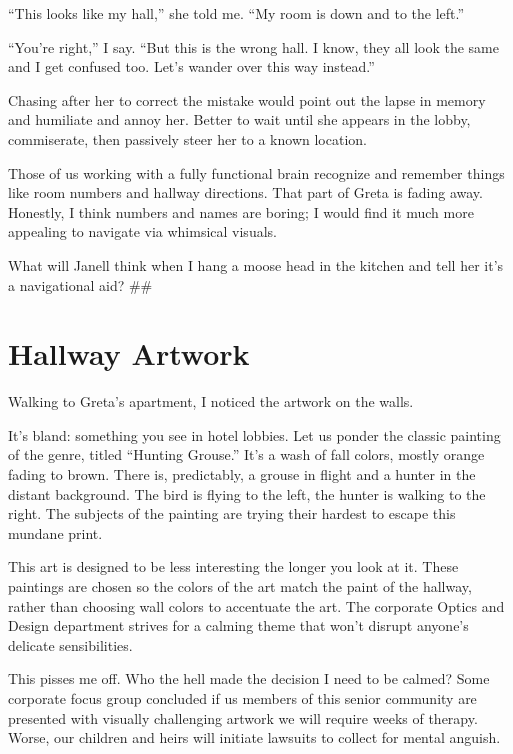 \documentclass[
  letterpaper,
  DIV=11,
  numbers=noendperiod]{scrreprt}
\begin{document}
``This looks like my hall,'' she told me. ``My room is down and to the
left.''

``You're right,'' I say. ``But this is the wrong hall. I know, they all
look the same and I get confused too. Let's wander over this way
instead.''

Chasing after her to correct the mistake would point out the lapse in
memory and humiliate and annoy her. Better to wait until she appears in
the lobby, commiserate, then passively steer her to a known location.

Those of us working with a fully functional brain recognize and remember
things like room numbers and hallway directions. That part of Greta is
fading away. Honestly, I think numbers and names are boring; I would
find it much more appealing to navigate via whimsical visuals.

What will Janell think when I hang a moose head in the kitchen and tell
her it's a navigational aid? \#\#


\chapter*{Hallway Artwork}\label{hallway-artwork}


Walking to Greta's apartment, I noticed the artwork on the walls.

It's bland: something you see in hotel lobbies. Let us ponder the
classic painting of the genre, titled ``Hunting Grouse.'' It's a wash of
fall colors, mostly orange fading to brown. There is, predictably, a
grouse in flight and a hunter in the distant background. The bird is
flying to the left, the hunter is walking to the right. The subjects of
the painting are trying their hardest to escape this mundane print.

This art is designed to be less interesting the longer you look at it.
These paintings are chosen so the colors of the art match the paint of
the hallway, rather than choosing wall colors to accentuate the art. The
corporate Optics and Design department strives for a calming theme that
won't disrupt anyone's delicate sensibilities.

This pisses me off. Who the hell made the decision I need to be calmed?
Some corporate focus group concluded if us members of this senior
community are presented with visually challenging artwork we will
require weeks of therapy. Worse, our children and heirs will initiate
lawsuits to collect for mental anguish.
\end{document}

